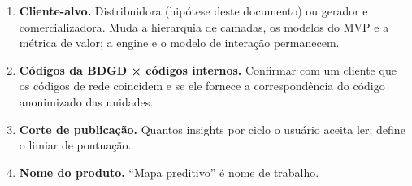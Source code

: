 \documentclass[11pt,a4paper]{article}
\begin{document}
\begin{enumerate}
  \item \textbf{Cliente-alvo.} Distribuidora (hipótese deste documento) ou
    gerador e comercializadora. Muda a hierarquia de camadas, os modelos do
    MVP e a métrica de valor; a engine e o modelo de interação permanecem.
  \item \textbf{Códigos da BDGD × códigos internos.} Confirmar com um cliente
    que os códigos de rede coincidem e se ele fornece a correspondência do
    código anonimizado das unidades.
  \item \textbf{Corte de publicação.} Quantos insights por ciclo o usuário
    aceita ler; define o limiar de pontuação.
  \item \textbf{Nome do produto.} ``Mapa preditivo'' é nome de trabalho.
\end{enumerate}
\end{document}
